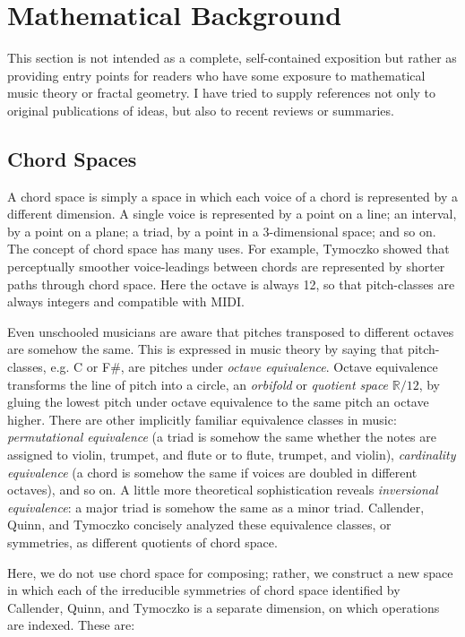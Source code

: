 \documentclass[english,11pt,letterpaper,onecolumn]{scrartcl}
\begin{document}
\section{Mathematical Background}

This section is not intended as a complete, self-contained exposition but 
rather as providing entry points for readers who have some exposure to 
mathematical music theory or fractal geometry. I have tried to supply 
references not only to original publications of ideas, but also to recent 
reviews or summaries.

\subsection{Chord Spaces}

A chord space is simply a space in which each voice of a chord is represented 
by a different dimension. A single voice is represented by a point on a line; 
an interval, by a point on a plane; a triad, by a point in a 3-dimensional 
space; and so on. The concept of chord space has many uses. For example, 
Tymoczko \cite{tymoczko2006geometry, tymoczko2011geometry} showed that 
perceptually smoother voice-leadings between chords are represented by shorter 
paths through chord space. Here the octave is always 12, so that pitch-classes 
are always integers and compatible with MIDI.

Even unschooled musicians are aware that pitches transposed to different 
octaves are somehow the same. This is expressed in music theory by saying that 
pitch-classes, e.g. C or F\#, are pitches under \textit{octave equivalence}. 
Octave equivalence transforms the line of pitch into a circle, an 
\textit{orbifold} or \textit{quotient space} $\mathbb{R}/12$, by 
gluing the lowest pitch under octave equivalence to the same pitch an octave 
higher. There are other implicitly familiar equivalence classes in music: 
\textit{permutational equivalence} (a triad is somehow the same whether the 
notes are assigned to violin, trumpet, and flute or to flute, trumpet, and 
violin), \textit{cardinality equivalence} (a chord is somehow the same if 
voices are doubled in different octaves), and so on. A little more theoretical 
sophistication reveals \textit{inversional equivalence}: a major triad is 
somehow the same as a minor triad. Callender, Quinn, and Tymoczko 
\cite{callender:346} concisely analyzed these equivalence classes, or 
symmetries, as different quotients of chord space.

Here, we do not use chord space for composing; rather, we construct a new 
space in which each of the irreducible symmetries of chord space identified by 
Callender, Quinn, and Tymoczko is a separate dimension, on which operations 
are indexed. These are:
\end{document}
